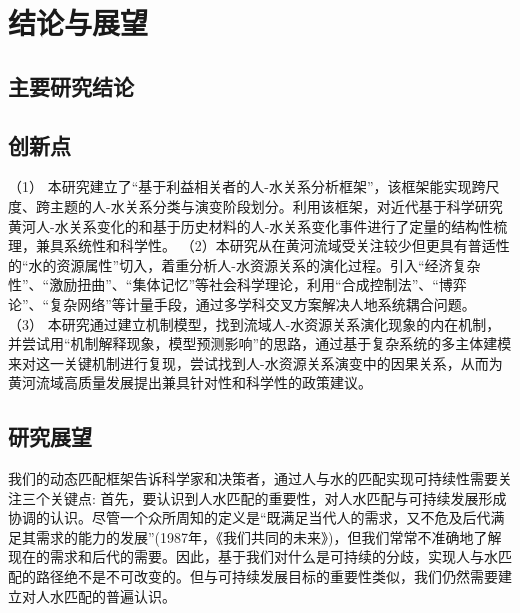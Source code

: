 \chapter{结论与展望}

\section{主要研究结论}

\section{创新点}
（1） 本研究建立了“基于利益相关者的人-水关系分析框架”，该框架能实现跨尺度、跨主题的人-水关系分类与演变阶段划分。利用该框架，对近代基于科学研究黄河人-水关系变化的和基于历史材料的人-水关系变化事件进行了定量的结构性梳理，兼具系统性和科学性。
（2）本研究从在黄河流域受关注较少但更具有普适性的“水的资源属性”切入，着重分析人-水资源关系的演化过程。引入“经济复杂性”、“激励扭曲”、“集体记忆”等社会科学理论，利用“合成控制法”、“博弈论”、“复杂网络”等计量手段，通过多学科交叉方案解决人地系统耦合问题。
（3） 本研究通过建立机制模型，找到流域人-水资源关系演化现象的内在机制，并尝试用“机制解释现象，模型预测影响”的思路，通过基于复杂系统的多主体建模来对这一关键机制进行复现，尝试找到人-水资源关系演变中的因果关系，从而为黄河流域高质量发展提出兼具针对性和科学性的政策建议。

\section{研究展望}

我们的动态匹配框架告诉科学家和决策者，通过人与水的匹配实现可持续性需要关注三个关键点:
首先，要认识到人水匹配的重要性，对人水匹配与可持续发展形成协调的认识。尽管一个众所周知的定义是“既满足当代人的需求，又不危及后代满足其需求的能力的发展”(1987年，《我们共同的未来》)，但我们常常不准确地了解现在的需求和后代的需要。因此，基于我们对什么是可持续的分歧，实现人与水匹配的路径绝不是不可改变的。但与可持续发展目标的重要性类似，我们仍然需要建立对人水匹配的普遍认识。

